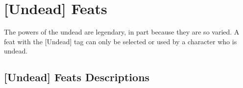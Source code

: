 \section{[Undead] Feats}

The powers of the undead are legendary, in part because they are so varied. A feat with the [Undead] tag can only be selected or
used by a character who is undead.
\vspace*{\baselineskip}

\subsection{[Undead] Feats Descriptions}





